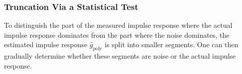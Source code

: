 
\subsubsection{Truncation Via a Statistical Test}\label{se:truncstattest}

\newcommand{\segm}[2]{\ensuremath{{#1}^{[#2]}}}
\newcommand{\RMS}{\ensuremath{\,\mathrm{rms}\,}}
\newcommand{\rms}[1]{\ensuremath{\RMS\left(#1\right)}}
\newcommand{\floor}[1]{\ensuremath{\lfloor #1 \rfloor}}

To distinguish the part of the measured impulse response where the actual impulse response dominates from the part where the noise dominates, the estimated
 impulse response $\hat{g}_\mathrm{poly}$ is split into smaller segments. One can then gradually determine whether these segments are noise or the actual impulse response.


